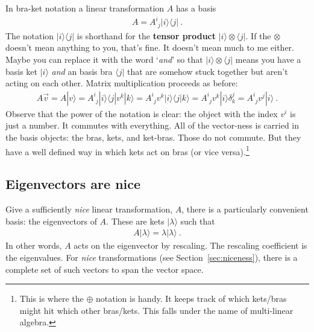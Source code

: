 In bra-ket notation a linear transformation $A$ has a basis
\begin{align}
  A = A^i_{\phantom{i}j} |i\rangle \langle j| \ .
\end{align}
The notation $|i\rangle \langle j|$ is shorthand for the \textbf{tensor product} $|i\rangle \otimes \langle j|$. If the $\otimes$ doesn’t mean anything to you, that’s fine. It doesn’t mean much to me either. Maybe you can replace it with the word `\emph{and}' so that $|i\rangle \otimes \langle j|$ means you have a basis ket $|i\rangle$ \emph{and} an basis bra $\langle j|$ that are somehow stuck together but aren't acting on each other. Matrix multiplication proceeds as before:
\begin{align}
  A\vec{v} = A|v\rangle = 
  A^i_{\phantom{i}j} |i\rangle \langle j| v^k |k \rangle
  = 
  A^i_{\phantom{i}j}  v^k  |i\rangle \langle j|k \rangle
  = 
  A^i_{\phantom{i}j}  v^k  |i\rangle \delta^j_k
  = 
  A^i_{\phantom{i}j}  v^j  |i\rangle \ .
\end{align}
Observe that the power of the notation is clear: the object with the index $v^i$ is just a number. It commutes with everything. All of the vector-ness is carried in the basis objects: the bras, kets, and ket-bras. Those do not commute. But they have a well defined way in which kets act on bras (or vice versa).\footnote{This is where the $\oplus$ notation is handy. It keeps track of which kets/bras might hit which other bras/kets. This falls under the name of multi-linear algebra.}


\subsection{Eigenvectors are nice}
\label{sec:eigenvectors}

Give a sufficiently \emph{nice} linear transformation, $A$, there is a particularly convenient basis: the eigenvectors of $A$. These are kets $|\lambda\rangle$ such that
\begin{align}
  A |\lambda\rangle = \lambda |\lambda\rangle \ .
\end{align}
In other words, $A$ acts on the eigenvector by rescaling. The rescaling coefficient is the eigenvalues. For \emph{nice} transformations (see Section~\ref{sec:niceness}), there is a complete set of such vectors to span the vector space.

